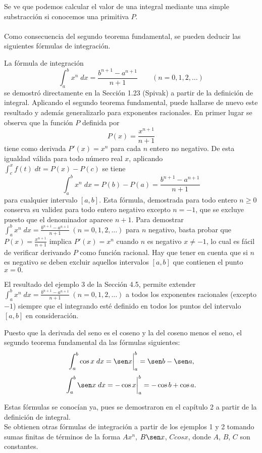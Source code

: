 Se ve que podemos calcular el valor de una integral mediante una simple substracción si conocemos una primitiva $P$.\\\\

Como consecuencia del segundo teorema fundamental, se pueden deducir las siguientes fórmulas de integración.

\begin{ejem}
    La fórmula de integración
    $$\int_a^b x^n\; dx = \dfrac{b^{n+1}-a^{n+1}}{n+1}\qquad (n=0,1,2,\ldots)$$
    se demostró directamente en la Sección 1.23 (Spivak) a partir de la definición de integral. Aplicando el segundo teorema fundamental, puede hallarse de nuevo este resultado y además generalizarlo para exponentes racionales. En primer lugar se observa que la función $P$ definida por
    $$P(x)=\dfrac{x^{n+1}}{n+1}$$
    tiene como derivada $P'(x)=x^n$ para cada $n$ entero no negativo. De esta igualdad válida para todo número real $x$, aplicando $\int_c^x f(t)\; dt = P(x)-P(c)$ se tiene
    $$\int_a^b x^n\; dx  = P(b)-P(a)=\dfrac{b^{n+1}-a^{n+1}}{n+1}$$
    para cualquier intervalo $[a,b]$. Esta fórmula, demostrada para todo entero $n\geq 0$ conserva su validez para todo entero negativo excepto $n=-1$, que se excluye puesto que el denominador aparece $n+1$. Para demostrar $\int_a^b x^n\; dx = \frac{b^{n+1}-a^{n+1}}{n+1}\; (n=0,1,2,\ldots)$ para $n$ negativo, basta probar que $P(x)=\frac{x^{n+1}}{n+1}$ implica $P'(x)=x^n$ cuando $n$ es negativo $x\neq -1$, lo cual es fácil de verificar derivando $P$ como función racional. Hay que tener en cuenta que si $n$ es negativo se deben excluir aquellos intervalos $[a,b]$ que contienen el punto $x=0.$
\end{ejem}

El resultado del ejemplo 3 de la Sección 4.5, permite extender $\int_a^b x^n\; dx = \frac{b^{n+1}-a^{n+1}}{n+1}\; (n=0,1,2,\ldots)$ a todos los exponentes racionales (excepto $-1$) siempre que el integrando esté definido en todos los puntos del intervalo $[a, b]$ en consideración.

\begin{ejem}
    Puesto que la derivada del seno es el coseno y la del coseno menos el seno, el segundo teorema fundamental da las fórmulas siguientes:
    $$\int_a^b \cos x \; dx = \sen x\bigg|_a^b = \sen b -\sen a,$$
    $$\int_a^b \sen x \; dx = -\cos x\bigg|_a^b = -\cos b +\cos a.$$
\end{ejem}
    Estas fórmulas se conocían ya, pues se demostraron en el capítulo 2 a partir de la definición de integral. \\
    Se obtienen otras fórmulas de integración a partir de los ejemplos 1 y 2 tomando sumas finitas de términos de la forma $Ax^n$, $B \sen x$, $C cos x$, donde $A$, $B$, $C$ son constantes.


